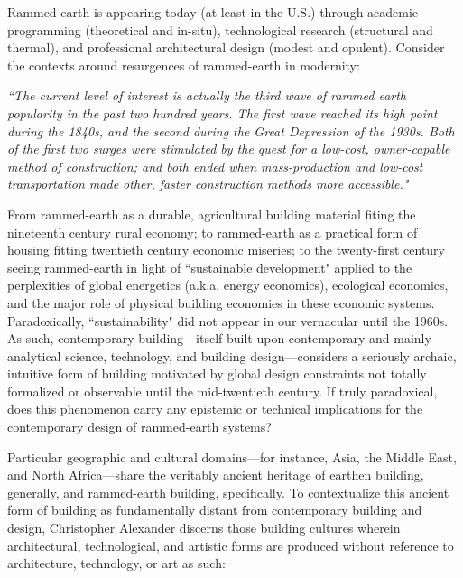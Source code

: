 Rammed-earth is appearing today (at least in the U.S.) through academic programming (theoretical and in-situ), technological research (structural and thermal), and professional architectural design (modest and opulent). Consider the contexts around resurgences of rammed-earth in modernity:

\begin{flushright}
\small{
\textit{
``The current level of interest is actually the third wave of rammed earth popularity in the past two hundred years. The first wave reached its high point during the 1840s, and the second during the Great Depression of the 1930s. Both of the first two surges were stimulated by the quest for a low-cost, owner-capable method of construction; and both ended when mass-production and low-cost transportation made other, faster construction methods more accessible."}} \cite[p11, 12]{RAMMEDEARTHHOUSE}
\end{flushright}

From rammed-earth as a durable, agricultural building material fiting the nineteenth century rural economy; to rammed-earth as a practical form of housing fitting twentieth century economic miseries; to the twenty-first century seeing rammed-earth in light of ``sustainable development" applied to the perplexities of global energetics (a.k.a. energy economics), ecological economics, and the major role of physical building economies in these economic systems. Paradoxically, ``sustainability" did not appear in our vernacular until the 1960s. As such, contemporary building---itself built upon contemporary and mainly analytical science, technology, and building design---considers a seriously archaic, intuitive form of building motivated by global design constraints not totally formalized or observable until the mid-twentieth century. If truly paradoxical, does this phenomenon carry any epistemic or technical implications for the contemporary design of rammed-earth systems?

Particular geographic and cultural domains---for instance, Asia, the Middle East, and North Africa---share the veritably ancient heritage of earthen building, generally, and rammed-earth building, specifically. \cite{RAMMEDEARTHHOUSE} To contextualize this ancient form of building as fundamentally distant from contemporary building and design, Christopher Alexander discerns those building cultures wherein architectural, technological, and artistic forms are produced without reference to architecture, technology, or art as such:


